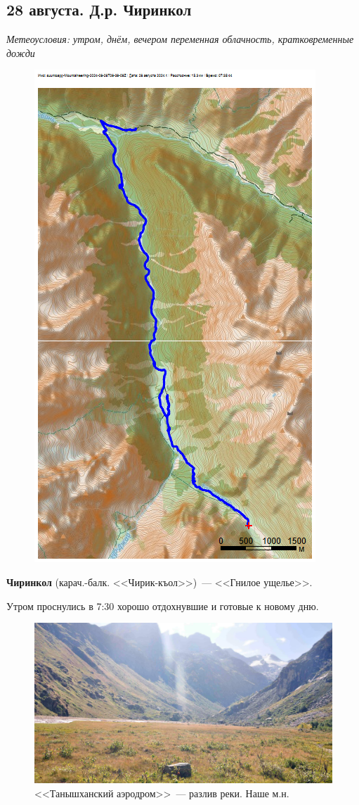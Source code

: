 \subsection{28 августа. Д.р. Чиринкол}

\textit{Метеоусловия: утром, днём, вечером переменная облачность, кратковременные дожди}

\begin{figure}[h!]
	\centering
	\includegraphics[angle=0, width=0.7\linewidth]{../pics/mini_maps/28}
	\label{fig:mini_28}
\end{figure}

\textbf{Чиринкол} (карач.-балк. <<Чирик-къол>>)~--- <<Гнилое ущелье>>.

Утром проснулись в 7:30 хорошо отдохнувшие и готовые к новому дню.


\begin{figure}[h!]
	\centering
	\includegraphics[width=0.7\linewidth]{../pics/DSC_0434 2.jpg}
	\caption{<<Танышханский аэродром>>~--- разлив реки. Наше м.н.}
	\label{fig:DSC_0434}
\end{figure}

